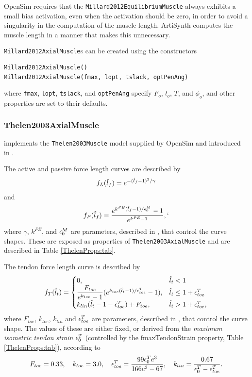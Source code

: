 \begin{sideblock}
OpenSim requires that the {\tt Millard2012EquilibriumMuscle} always
exhibits a small bias activation, even when the activation should be
zero, in order to avoid a singularity in the computation of the muscle
length. ArtiSynth computes the muscle length in a manner that makes
this unnecessary.
\end{sideblock}

{\tt Millard2012AxialMuscle}s can be created using the constructors
\begin{lstlisting}[]
Millard2012AxialMuscle()
Millard2012AxialMuscle(fmax, lopt, tslack, optPenAng)
\end{lstlisting}
%
where {\tt fmax}, {\tt lopt}, {\tt tslack}, and {\tt optPenAng}
specify $F_{o}$, $l_o$, $T$, and $\phi_o$, and other properties are
set to their defaults.

\subsubsection{Thelen2003AxialMuscle}
\label{Thelen2003AxialMuscle:sec}

 implements
the {\tt Thelen2003Muscle} model supplied by OpenSim
\cite{delp2007opensim} and introduced in \cite{thelen2003adjustment}.

The active and passive force length curves are described by
%
\begin{equation}
f_L(\hat{l}_f) = e^{-(\hat{l}_f-1)^2/\gamma}
\end{equation}
%
and
%
\begin{equation}
f_P(\hat{l}_f) = \frac{e^{k^{PE} (\hat{l}_f-1)/\epsilon_0^M}-1}{e^{k^{PE}-1}},`
\end{equation}
%
where $\gamma$, $k^{PE}$, and $\epsilon_0^M$ are parameters, described
in \cite{thelen2003adjustment}, that control the curve shapes.  These
are exposed as properties of {\tt Thelen2003AxialMuscle} and are
described in Table \ref{ThelenProps:tab}.

The tendon force length curve is described by
\begin{equation}
f_T(\hat{l}_t) = 
\begin{cases}
0, & \hat{l}_t < 1 \\
\dfrac{F_{toe}}{e^{k_{toe}}-1}(e^{k_{toe} (\hat{l}_t-1)/\epsilon^T_{toe}}-1), &
\hat{l}_t \le 1+\epsilon^T_{toe}\\
k_{lin} (\hat{l}_t - 1 - \epsilon^T_{toe}) + F_{toe}, &
\hat{l}_t  > 1+\epsilon^T_{toe},
\end{cases}
\label{Thelen2003TFLC:eqn}
\end{equation}
%
where $F_{toe}$, $k_{toe}$, $k_{lin}$ and $\epsilon^T_{toe}$ are
parameters, described in \cite{thelen2003adjustment}, that control the
curve shape. The values of these are either fixed, or derived from the
{\it maximum isometric tendon strain} $\epsilon_0^T$ (controlled by the
{\sf fmaxTendonStrain} property, Table \ref{ThelenProps:tab}),
according to
%
\begin{equation}
F_{toe} = 0.33, \quad k_{toe} = 3.0, \quad
\epsilon^T_{toe} = \frac{99 \epsilon_0^T e^3}{166 e^3 - 67}, \quad
k_{lin} = \frac{0.67}{\epsilon_0^T - \epsilon^T_{toe}}.
\label{Thelen2003TFLCParams:eqn}
\end{equation}
%

